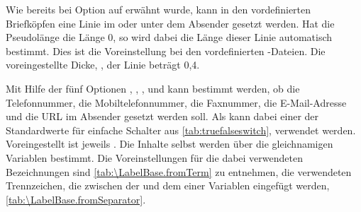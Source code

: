 \begin{Declaration}
\end{Declaration}
Wie bereits bei Option
 auf
 erwähnt wurde, kann in den
vordefinierten Briefköpfen eine Linie im oder unter dem Absender gesetzt
werden. Hat die Pseudolänge  die
Länge 0, so wird dabei die Länge dieser Linie automatisch bestimmt. Dies ist
die Voreinstellung bei den vordefinierten
-Dateien. %
\iffalse %
Der Wert kann mit \DescRef{\LabelBase.cmd.setplength} (siehe
\DescPageRef{\LabelBase.cmd.setplength}) in eigenen \File{lco}-Dateien aber
auch abweichend gesetzt werden. %
\fi%
Die voreingestellte Dicke,
, der Linie beträgt 0,4.%
\EndIndexGroup


\begin{Declaration}
\end{Declaration}%
Mit Hilfe der fünf Optionen ,
, ,
 und  kann bestimmt werden, ob die
Telefonnummer, die
Mobiltelefonnummer, die Faxnummer,
die E-Mail-Adresse und die URL im Absender gesetzt werden
soll. Als  kann dabei einer der Standardwerte für einfache
Schalter aus \autoref{tab:truefalseswitch}, 
verwendet werden. Voreingestellt ist jeweils
. Die Inhalte selbst werden über die gleichnamigen Variablen
bestimmt. Die Voreinstellungen für die dabei verwendeten Bezeichnungen sind
\autoref{tab:\LabelBase.fromTerm} zu entnehmen, die verwendeten Trennzeichen,
die zwischen der  und dem  einer Variablen
eingefügt werden, \autoref{tab:\LabelBase.fromSeparator}.

